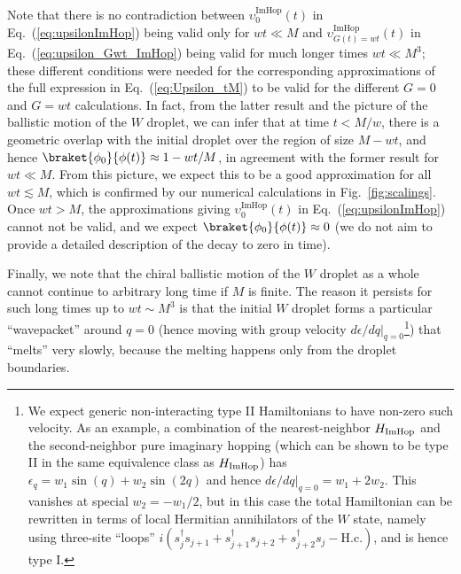 \documentclass[prx,letterpaper,aps,superscriptaddress,floatfix,twocolumn,nofootinbib]{revtex4-2}
\theoremstyle{definition}
\begin{document}
%
Note that there is no contradiction between $\upsilon_0^{\text{ImHop}}(t)$ in Eq.~(\ref{eq:upsilonImHop}) being valid only for $wt \ll M$ and $\upsilon_{G(t)=wt}^{\text{ImHop}}(t)$ in Eq.~(\ref{eq:upsilon_Gwt_ImHop}) being valid for much longer times $wt \ll M^3$; these different conditions were needed for the corresponding approximations of the full expression in Eq.~(\ref{eq:Upsilon_tM}) to be valid for the different $G=0$ and $G=wt$ calculations.
%
In fact, from the latter result and the picture of the ballistic motion of the $W$ droplet, we can infer that at time $t < M/w$, there is a geometric overlap with the initial droplet over the region of size $M - wt$, and hence $\braket{\phi_0}{\phi(t)} \approx 1 - wt/M$, in agreement with the former result for $wt \ll M$.
%
From this picture, we expect this to be a good approximation for all $wt \lesssim M$, which is confirmed by our numerical calculations in Fig.~\ref{fig:scalings}.
%
Once $wt > M$, the approximations giving $\upsilon_0^{\text{ImHop}}(t)$ in Eq.~(\ref{eq:upsilonImHop}) cannot not be valid, and we expect $\braket{\phi_0}{\phi(t)} \approx 0$ (we do not aim to provide a detailed description of the decay to zero in time).
%

%
Finally, we note that the chiral ballistic motion of the $W$ droplet as a whole cannot continue to arbitrary long time if $M$ is finite.
%
The reason it persists for such long times up to $wt \sim M^3$ is that the initial $W$ droplet forms a particular ``wavepacket'' around $q=0$ (hence moving with group velocity $d\epsilon/dq|_{q=0}$\footnote{We expect generic non-interacting type II Hamiltonians to have non-zero such velocity.
%
As an example, a combination of the nearest-neighbor $H_{\rm ImHop}$ and the second-neighbor pure imaginary hopping (which can be shown to be type II in the same equivalence class as $H_{\rm ImHop}$) has $\epsilon_q = w_1 \sin(q) + w_2 \sin(2q)$ and hence $d\epsilon/dq|_{q=0} = w_1 + 2 w_2$.
%
This vanishes at special $w_2 = -w_1/2$, but in this case the total Hamiltonian can be rewritten in terms of local Hermitian annihilators of the $W$ state, namely using three-site ``loops'' $i (s_j^\dagger s_{j+1} + s_{j+1}^\dagger s_{j+2} + s_{j+2}^\dagger s_j - \text{H.c.})$, and is hence type I.}) that ``melts'' very slowly, because the melting happens only from the droplet boundaries.
%
\end{document}
